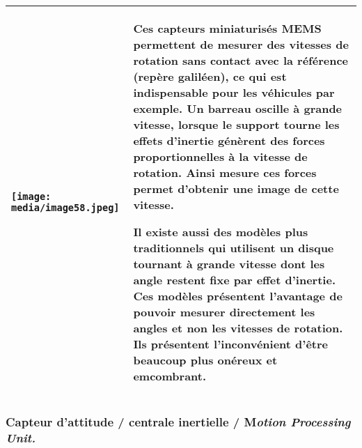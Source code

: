 \documentclass[
]{article}
\begin{document}
\begin{longtable}[]{@{}
  >{\raggedright\arraybackslash}p{}
  >{\raggedright\arraybackslash}p{}@{}}
\toprule
\endhead
\texttt{[image: media/image58.jpeg]} &
Ces capteurs miniaturisés MEMS permettent de mesurer des vitesses de
rotation sans contact avec la référence (repère galiléen), ce qui est
indispensable pour les véhicules par exemple. Un barreau oscille à
grande vitesse, lorsque le support tourne les effets d'inertie génèrent
des forces proportionnelles à la vitesse de rotation. Ainsi mesure ces
forces permet d'obtenir une image de cette vitesse.

Il existe aussi des modèles plus traditionnels qui utilisent un disque
tournant à grande vitesse dont les angle restent fixe par effet
d'inertie. Ces modèles présentent l'avantage de pouvoir mesurer
directement les angles et non les vitesses de rotation. Ils présentent
l'inconvénient d'être beaucoup plus onéreux et emcombrant. \\
\bottomrule
\end{longtable}

\hypertarget{capteur-dattitude-centrale-inertielle-motion-processing-unit.}{%
\subsubsection{\texorpdfstring{Capteur d'attitude / centrale inertielle
/ M\emph{otion Processing
Unit.}}{Capteur d'attitude / centrale inertielle / Motion Processing Unit.}}\label{capteur-dattitude-centrale-inertielle-motion-processing-unit.}}
\end{document}

